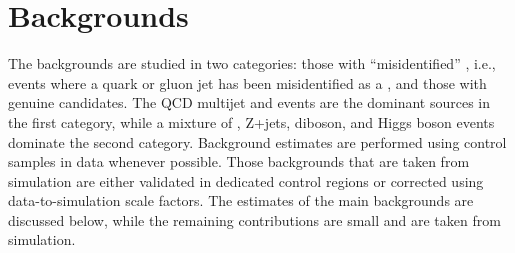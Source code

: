 \section{Backgrounds}
\label{sect:bkg}
The backgrounds are studied in two categories: those with 
``misidentified'' \Tau, i.e., events where a quark or gluon jet has been misidentified
as a \Tau, and those with genuine \Tau candidates.
The QCD multijet and \wjets events are the dominant sources in the first category, while a mixture of \ttbar, Z+jets, diboson, and Higgs boson 
events dominate the second category. Background estimates are performed using control samples in data whenever possible. 
Those backgrounds that are taken from simulation are either validated in dedicated control regions or corrected using data-to-simulation scale factors. 
The estimates of the main backgrounds are discussed below, while the remaining contributions are small and are taken from simulation.


